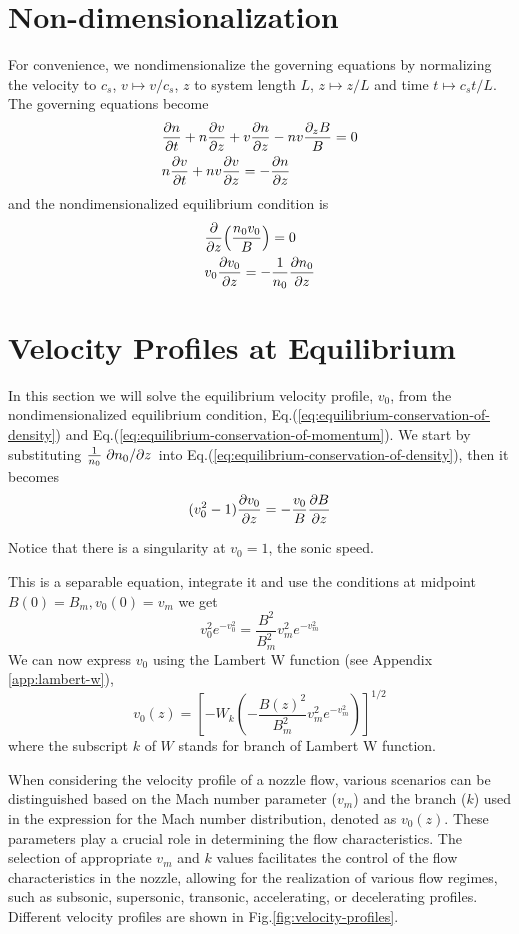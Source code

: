 \section{Non-dimensionalization}
For convenience, we nondimensionalize the governing equations by normalizing the velocity to $c_s$, $v\mapsto v/c_s$, $z$ to system length $L$, $z \mapsto z/L$ and time $t\mapsto c_s t/L$. The governing equations become
\begin{align}
	 & \pdv{n}{t} + n\pdv{v}{z} + v\pdv{n}{z} - nv\frac{\partial_z B}{B} = 0
	\label{eq:conservation-of-density}
	\\
	 & n\pdv{v}{t} + nv\pdv{v}{z} = -\pdv{n}{z}
	\label{eq:conservation-of-momentum}
\end{align}
and the nondimensionalized equilibrium condition is
\begin{align}
	 & \pdv{z}(\frac{n_0v_0}{B}) = 0 \label{eq:equilibrium-conservation-of-density}                 \\
	 & v_0\pdv{v_0}{z} = -\frac{1}{n_0}\pdv{n_0}{z} \label{eq:equilibrium-conservation-of-momentum}
\end{align}

\section{Velocity Profiles at Equilibrium}
In this section we will solve the equilibrium velocity profile, $v_0$, from the nondimensionalized equilibrium condition, Eq.(\ref{eq:equilibrium-conservation-of-density}) and Eq.(\ref{eq:equilibrium-conservation-of-momentum}).
We start by substituting $\frac{1}{n_0}\pdv*{n_0}{z}$ into Eq.(\ref{eq:equilibrium-conservation-of-density}), then it becomes
\[ (v_0^2-1)\pdv{v_0}{z} = -\frac{v_0}{B}\pdv{B}{z} \]

Notice that there is a singularity at $v_0=1$, the sonic speed.

This is a separable equation, integrate it and use the conditions at midpoint $B(0)=B_m, v_0(0)=v_m$ we get
\[ v_0^2e^{-v_0^2} = \frac{B^2}{B_m^2}v_m^2e^{-v_m^2} \]
We can now express $v_0$ using the Lambert W function (see Appendix \ref{app:lambert-w}),
\[ v_0(z) = \left[ -W_k\left(-\frac{B(z)^2}{B_m^2}v_m^2e^{-v_m^2}\right) \right]^{1/2} \]
where the subscript $k$ of $W$ stands for branch of Lambert W function.

When considering the velocity profile of a nozzle flow, various scenarios can be distinguished based on the Mach number parameter ($v_m$) and the branch ($k$) used in the expression for the Mach number distribution, denoted as $v_0(z)$. These parameters play a crucial role in determining the flow characteristics. The selection of appropriate $v_m$ and $k$ values facilitates the control of the flow characteristics in the nozzle, allowing for the realization of various flow regimes, such as subsonic, supersonic, transonic, accelerating, or decelerating profiles. Different velocity profiles are shown in Fig.\ref{fig:velocity-profiles}.

